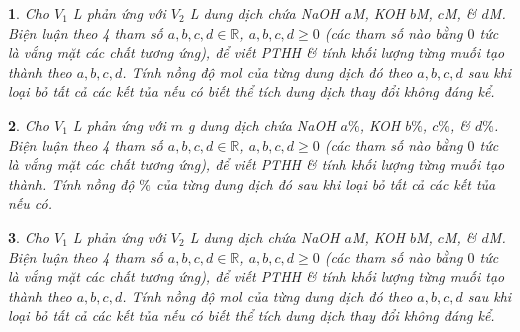 \documentclass{article}
\newtheorem{baitoan}{}
\begin{document}
\begin{baitoan}
	Cho $V_1$ {\rm L } phản ứng với $V_2$ {\rm L} dung dịch chứa {\rm NaOH $a$M, KOH $b$M,  $c$M, \&  $d$M}. Biện luận theo 4 tham số $a,b,c,d\in\mathbb{R}$, $a,b,c,d\ge0$ (các tham số nào bằng $0$ tức là vắng mặt các chất tương ứng), để viết {\rm PTHH} \& tính khối lượng từng muối tạo thành theo $a,b,c,d$. Tính nồng độ mol của từng dung dịch đó theo $a,b,c,d$ sau khi loại bỏ tất cả các kết tủa nếu có biết thể tích dung dịch thay đổi không đáng kể.
\end{baitoan}

\begin{baitoan}
	Cho $V_1$ {\rm L } phản ứng với $m$ {\rm g} dung dịch chứa {\rm NaOH $a\%$, KOH $b\%$,  $c\%$, \&  $d\%$}. Biện luận theo 4 tham số $a,b,c,d\in\mathbb{R}$, $a,b,c,d\ge0$ (các tham số nào bằng $0$ tức là vắng mặt các chất tương ứng), để viết {\rm PTHH} \& tính khối lượng từng muối tạo thành. Tính nồng độ $\%$ của từng dung dịch đó sau khi loại bỏ tất cả các kết tủa nếu có.
\end{baitoan}

\begin{baitoan}
	Cho $V_1$ {\rm L } phản ứng với $V_2$ {\rm L} dung dịch chứa {\rm NaOH $a$M, KOH $b$M,  $c$M, \&  $d$M}. Biện luận theo 4 tham số $a,b,c,d\in\mathbb{R}$, $a,b,c,d\ge0$ (các tham số nào bằng $0$ tức là vắng mặt các chất tương ứng), để viết {\rm PTHH} \& tính khối lượng từng muối tạo thành theo $a,b,c,d$. Tính nồng độ mol của từng dung dịch đó theo $a,b,c,d$ sau khi loại bỏ tất cả các kết tủa nếu có biết thể tích dung dịch thay đổi không đáng kể.
\end{baitoan}
\end{document}
